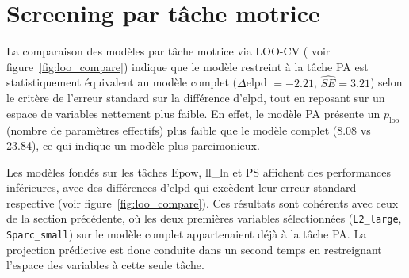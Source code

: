 \section{Screening par tâche motrice}

La comparaison des modèles par tâche motrice via LOO-CV (%
voir figure~\ref{fig:loo_compare}) indique que le modèle restreint à la tâche PA est statistiquement équivalent au modèle complet ($\Delta$elpd $= -2.21$, $\widehat{SE} = 3.21$) selon le critère de l'erreur standard sur la différence d'elpd, tout en reposant sur un espace de variables nettement plus faible. En effet, le modèle PA présente un $p_\text{loo}$ (nombre de paramètres effectifs) plus faible que le modèle complet (8.08 vs 23.84), ce qui indique un modèle plus parcimonieux.

\medskip

Les modèles fondés sur les tâches Epow, ll\_ln et PS affichent des performances inférieures, avec des différences d'elpd qui excèdent leur erreur standard respective (voir figure~\ref{fig:loo_compare}). %
Ces résultats sont cohérents avec ceux de la section précédente, où les deux premières variables sélectionnées (\texttt{L2\_large}, \texttt{Sparc\_small}) sur le modèle complet appartenaient déjà à la tâche PA. La projection prédictive est donc conduite dans un second temps en restreignant l'espace des variables à cette seule tâche.



